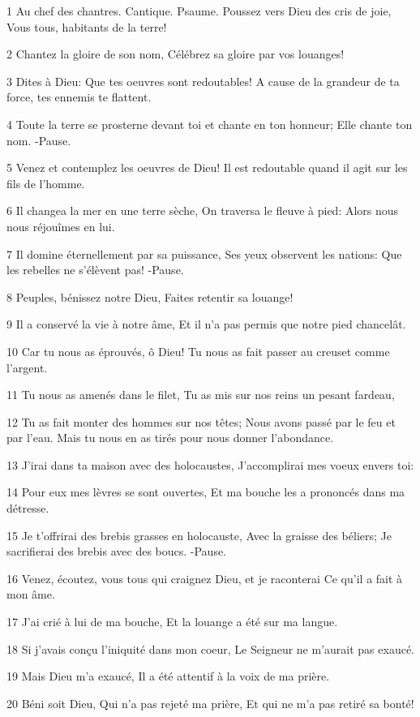 \par 1 Au chef des chantres. Cantique. Psaume. Poussez vers Dieu des cris de joie, Vous tous, habitants de la terre!
\par 2 Chantez la gloire de son nom, Célébrez sa gloire par vos louanges!
\par 3 Dites à Dieu: Que tes oeuvres sont redoutables! A cause de la grandeur de ta force, tes ennemis te flattent.
\par 4 Toute la terre se prosterne devant toi et chante en ton honneur; Elle chante ton nom. -Pause.
\par 5 Venez et contemplez les oeuvres de Dieu! Il est redoutable quand il agit sur les fils de l'homme.
\par 6 Il changea la mer en une terre sèche, On traversa le fleuve à pied: Alors nous nous réjouîmes en lui.
\par 7 Il domine éternellement par sa puissance, Ses yeux observent les nations: Que les rebelles ne s'élèvent pas! -Pause.
\par 8 Peuples, bénissez notre Dieu, Faites retentir sa louange!
\par 9 Il a conservé la vie à notre âme, Et il n'a pas permis que notre pied chancelât.
\par 10 Car tu nous as éprouvés, ô Dieu! Tu nous as fait passer au creuset comme l'argent.
\par 11 Tu nous as amenés dans le filet, Tu as mis sur nos reins un pesant fardeau,
\par 12 Tu as fait monter des hommes sur nos têtes; Nous avons passé par le feu et par l'eau. Mais tu nous en as tirés pour nous donner l'abondance.
\par 13 J'irai dans ta maison avec des holocaustes, J'accomplirai mes voeux envers toi:
\par 14 Pour eux mes lèvres se sont ouvertes, Et ma bouche les a prononcés dans ma détresse.
\par 15 Je t'offrirai des brebis grasses en holocauste, Avec la graisse des béliers; Je sacrifierai des brebis avec des boucs. -Pause.
\par 16 Venez, écoutez, vous tous qui craignez Dieu, et je raconterai Ce qu'il a fait à mon âme.
\par 17 J'ai crié à lui de ma bouche, Et la louange a été sur ma langue.
\par 18 Si j'avais conçu l'iniquité dans mon coeur, Le Seigneur ne m'aurait pas exaucé.
\par 19 Mais Dieu m'a exaucé, Il a été attentif à la voix de ma prière.
\par 20 Béni soit Dieu, Qui n'a pas rejeté ma prière, Et qui ne m'a pas retiré sa bonté!

